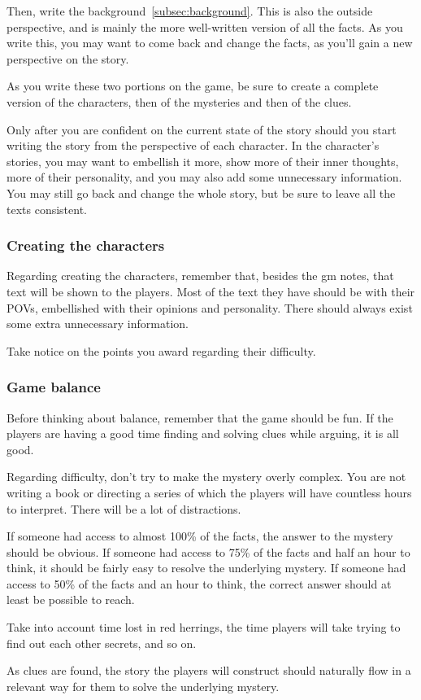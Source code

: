 Then, write the background~\ref{subsec:background}. This is also the outside perspective, and is mainly the more well-written version of all the facts. As you write this, you may want to come back and change the facts, as you'll gain a new perspective on the story.

As you write these two portions on the game, be sure to create a complete version of the characters, then of the mysteries and then of the clues.

Only after you are confident on the current state of the story should you start writing the story from the perspective of each character. In the character's stories, you may want to embellish it more, show more of their inner thoughts, more of their personality, and you may also add some unnecessary information. You may still go back and change the whole story, but be sure to leave all the texts consistent.

\subsubsection{Creating the characters}

Regarding creating the characters, remember that, besides the gm notes, that text will be shown to the players. Most of the text they have should be with their POVs, embellished with their opinions and personality. There should always exist some extra unnecessary information.

Take notice on the points you award regarding their difficulty.

\subsubsection{Game balance}

Before thinking about balance, remember that the game should be fun. If the players are having a good time finding and solving clues while arguing, it is all good.

Regarding difficulty, don't try to make the mystery overly complex. You are not writing a book or directing a series of which the players will have countless hours to interpret. There will be a lot of distractions.

If someone had access to almost 100\% of the facts, the answer to the mystery should be obvious.
If someone had access to 75\% of the facts and half an hour to think, it should be fairly easy to resolve the underlying mystery. If someone had access to 50\% of the facts and an hour to think, the correct answer should at least be possible to reach.

Take into account time lost in red herrings, the time players will take trying to find out each other secrets, and so on.

As clues are found, the story the players will construct should naturally flow in a relevant way for them to solve the underlying mystery.
